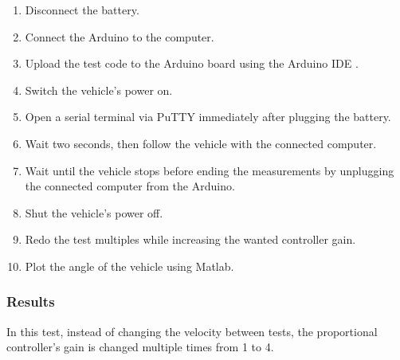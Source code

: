 \begin{enumerate}
  \item Disconnect the battery.
  \item Connect the Arduino to the computer.
  \item Upload the test code to the Arduino board using the Arduino IDE  \cite{ArduinoIDE}.
  \item Switch the vehicle's power on.
  \item Open a serial terminal via PuTTY \cite{PuTTY} immediately after plugging the battery.
  \item Wait two seconds, then follow the vehicle with the connected computer.
  \item Wait until the vehicle stops before ending the measurements by unplugging the connected computer from the Arduino.
  \item Shut the vehicle's power off.
  \item Redo the test multiples while increasing the wanted controller gain.
  \item Plot the angle of the vehicle using Matlab.
\end{enumerate}

\subsubsection{Results}

In this test, instead of changing the velocity between tests, the proportional controller's gain is changed multiple times from 1 to 4.\\

